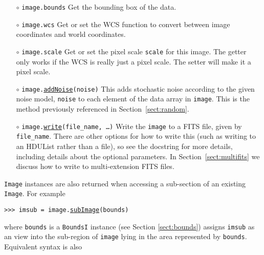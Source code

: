 \documentclass[preprint,10pt]{../../devel/modules/aastex}
\begin{document}
\begin{itemize}

  \item[$\circ$] 
  \texttt{image.bounds} 
    \newline 
    Get the bounding box of the data.

  \item[$\circ$] 
  \texttt{image.wcs} 
    \newline 
    Get or set the WCS function to convert between
    image coordinates and world coordinates.

  \item[$\circ$] 
  \texttt{image.scale} 
    \newline 
    Get or set the pixel
    scale \texttt{scale} for this image.  The getter only works if the WCS
    is really just a pixel scale.  The setter will make it a pixel scale.

  \item[$\circ$] 
  \texttt{image.\href{http://galsim-developers.github.io/GalSim/namespacegalsim_1_1noise.html\#aa45903c801b069774d5eafdbee54bda7}{addNoise}(noise)} 
    \newline 
    This adds
    stochastic noise according to the given noise model, \texttt{noise}
    to each element of the data array in \texttt{image}.
    This is the method previously referenced in Section~\ref{sect:random}.

  \item[$\circ$] 
  \texttt{image.\href{http://galsim-developers.github.io/GalSim/namespacegalsim_1_1fits.html\#a9f3f9dce30942b81d85d2f8928ece310}{write}(file\_name, \dots)}  
    \newline 
    Write the
    \texttt{image} to a FITS file, given by \texttt{file\_name}.
    There are other options for how to write this (such as writing to an HDUList 
    rather than a file), so see the docstring for more details, including
    details about the optional parameters.
    In Section~\ref{sect:multifits} we discuss how to write to multi-extension FITS files.

\end{itemize}

\texttt{Image} instances are also returned when
accessing a sub-section of an existing \texttt{Image}.  For example

\texttt{>>> imsub = image.\href{http://galsim-developers.github.io/GalSim/classgalsim_1_1image_1_1_image.html\#a968b8dce7fb7155a09fe44c064a285aa}{subImage}(bounds)}

where \texttt{bounds} is a \texttt{BoundsI} instance (see Section
\ref{sect:bounds}) assigns \texttt{imsub} as an view into
the sub-region of \texttt{image} lying in the area represented by
\texttt{bounds}.  Equivalent syntax is also
\end{document}
